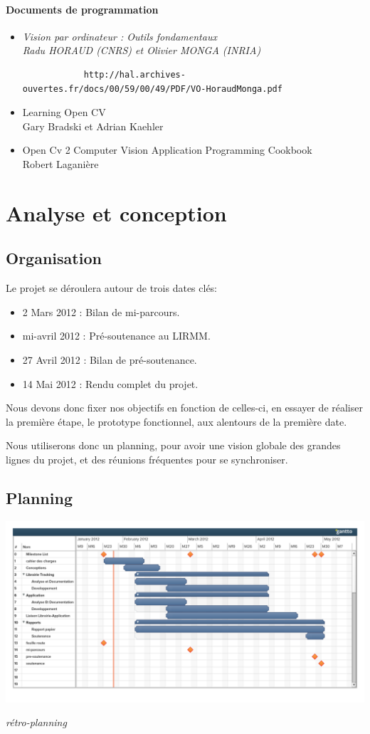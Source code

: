 \documentclass{article}
\begin{document}
		\paragraph{Documents de programmation}
			\begin{itemize}
			\item \it{Vision par ordinateur : Outils fondamentaux} \\
			Radu HORAUD (CNRS) et Olivier MONGA (INRIA)
			\begin{verbatim}
			http://hal.archives-ouvertes.fr/docs/00/59/00/49/PDF/VO-HoraudMonga.pdf
			\end{verbatim}
			\item Learning Open CV \\
			 Gary Bradski et Adrian Kaehler
			\item Open Cv 2 Computer Vision Application Programming Cookbook\\
			Robert Laganière
			\end{itemize}
			
	\section{Analyse et conception}
		\subsection{Organisation}
		Le projet se déroulera autour de trois dates clés:
			\begin{itemize}
				\item 2 Mars 2012 : Bilan de mi-parcours.
				\item mi-avril 2012 : Pré-soutenance au LIRMM.
				\item 27 Avril 2012 : Bilan de pré-soutenance.
				\item 14 Mai 2012 : Rendu complet du projet.
			\end{itemize}
			Nous devons donc fixer nos objectifs en fonction de celles-ci, en essayer de réaliser la première étape, le prototype fonctionnel, aux alentours de la première date.
		
			Nous utiliserons donc un planning, pour avoir une vision globale des grandes lignes du projet, et des réunions fréquentes pour se synchroniser. 
		\subsection{Planning}
			\includegraphics[scale=0.3]{retroplanning.pdf}
			\begin{center}
			\it{rétro-planning}
			\end{center}
			
\end{document}
